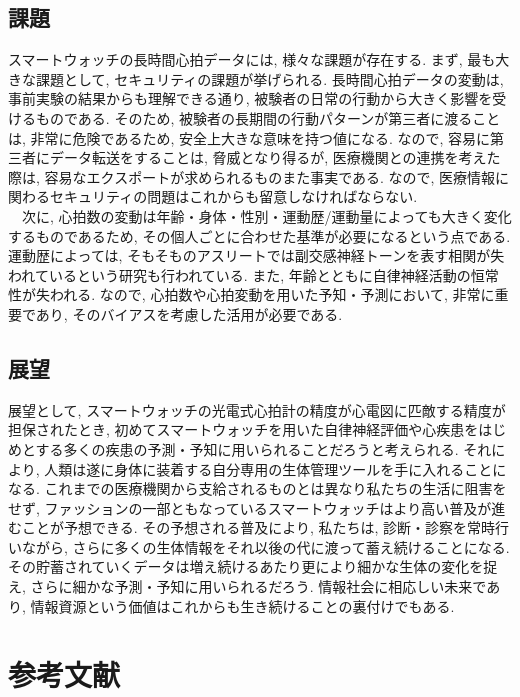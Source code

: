 \documentclass[report, 11pt, a4paper]{jsbook}
\begin{document}
\section{課題}
スマートウォッチの長時間心拍データには, 様々な課題が存在する. まず, 最も大きな課題として, セキュリティの課題が挙げられる. 長時間心拍データの変動は, 事前実験の結果からも理解できる通り, 被験者の日常の行動から大きく影響を受けるものである. そのため, 被験者の長期間の行動パターンが第三者に渡ることは, 非常に危険であるため, 安全上大きな意味を持つ値になる. なので, 容易に第三者にデータ転送をすることは, 脅威となり得るが, 医療機関との連携を考えた際は, 容易なエクスポートが求められるものまた事実である. なので, 医療情報に関わるセキュリティの問題はこれからも留意しなければならない. \\
　次に, 心拍数の変動は年齢・身体・性別・運動歴/運動量によっても大きく変化するものであるため, その個人ごとに合わせた基準が必要になるという点である. 運動歴によっては, そもそものアスリートでは副交感神経トーンを表す相関が失われているという研究も行われている. また, 年齢とともに自律神経活動の恒常性が失われる. なので, 心拍数や心拍変動を用いた予知・予測において, 非常に重要であり, そのバイアスを考慮した活用が必要である.

\section{展望}
展望として, スマートウォッチの光電式心拍計の精度が心電図に匹敵する精度が担保されたとき, 初めてスマートウォッチを用いた自律神経評価や心疾患をはじめとする多くの疾患の予測・予知に用いられることだろうと考えられる. それにより, 人類は遂に身体に装着する自分専用の生体管理ツールを手に入れることになる. これまでの医療機関から支給されるものとは異なり私たちの生活に阻害をせず, ファッションの一部ともなっているスマートウォッチはより高い普及が進むことが予想できる. その予想される普及により, 私たちは, 診断・診察を常時行いながら, さらに多くの生体情報をそれ以後の代に渡って蓄え続けることになる. その貯蓄されていくデータは増え続けるあたり更により細かな生体の変化を捉え, さらに細かな予測・予知に用いられるだろう. 情報社会に相応しい未来であり, 情報資源という価値はこれからも生き続けることの裏付けでもある. \\

\chapter{参考文献}
\end{document}
